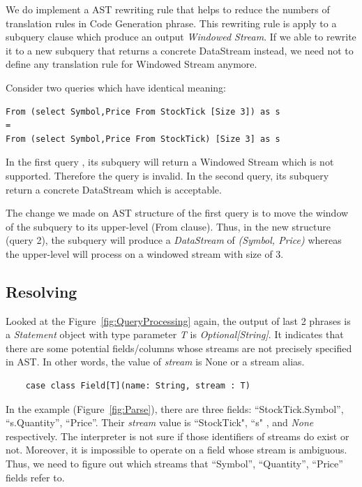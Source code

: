 We  do implement a AST rewriting rule that helps to reduce the numbers of translation rules in Code Generation phrase. This rewriting rule is apply to a subquery clause which produce an output \textit{Windowed Stream}. If we able to rewrite it to a new subquery that returns a concrete DataStream instead, we need not to define any translation rule for Windowed Stream anymore.

Consider two queries which have identical meaning:

\begin{lstlisting}
From (select Symbol,Price From StockTick [Size 3]) as s
=
From (select Symbol,Price From StockTick) [Size 3] as s
\end{lstlisting}

In the first query , its subquery will return a Windowed Stream which is not supported. Therefore the query is invalid. In the second query, its subquery return a concrete DataStream which is acceptable.

The change we made on AST structure of the first query is to move the window of the subquery to its upper-level (From clause). Thus, in the new structure (query 2), the subquery will produce a \textit{DataStream} of \textit{(Symbol, Price)} whereas the upper-level will process on a windowed stream with size of 3. 

\subsection{Resolving}
Looked at the Figure~\ref{fig:QueryProcessing} again,  the output of last 2 phrases is a \textit{Statement} object with type parameter \textit{T} is \textit{Optional[String]}.
It indicates that there are some potential fields/columns whose streams are not precisely specified in AST. In other words, the value of \textit{stream} is None or a stream alias.
\begin{lstlisting}
	case class Field[T](name: String, stream : T)
\end{lstlisting}

In the example (Figure~\ref{fig:Parse}), there are three fields: ``StockTick.Symbol”, ``s.Quantity”, ``Price”. Their \textit{stream} value is ``StockTick", ``s" , and \textit{None} respectively. The interpreter is not sure if those identifiers of streams do exist or not. Moreover, it is impossible to operate on a field whose stream is ambiguous. Thus, we need to figure out  which streams that ``Symbol”, ``Quantity”, ``Price”  fields refer to.

